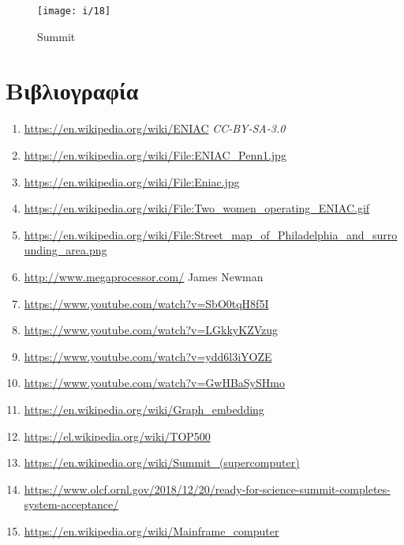 \documentclass[11pt,a4paper,notitlepage,fleqn]{article}
\begin{document}
\begin{figure}[H]
	\centering
	\texttt{[image: i/18]}\
	\caption{Summit}
	\label{fig:18}
\end{figure}


\newpage 

\section{Βιβλιογραφία}
\begin{enumerate}
	\item \url{https://en.wikipedia.org/wiki/ENIAC} \textit{CC-BY-SA-3.0}
	\item \url{https://en.wikipedia.org/wiki/File:ENIAC_Penn1.jpg}
	\item \url{https://en.wikipedia.org/wiki/File:Eniac.jpg}
	\item \url{https://en.wikipedia.org/wiki/File:Two_women_operating_ENIAC.gif}
	\item \url{https://en.wikipedia.org/wiki/File:Street_map_of_Philadelphia_and_surrounding_area.png}
	\item \url{http://www.megaprocessor.com/} James Newman
	\item \url{https://www.youtube.com/watch?v=SbO0tqH8f5I}
	\item \url{https://www.youtube.com/watch?v=LGkkyKZVzug}
	\item \url{https://www.youtube.com/watch?v=ydd6l3iYOZE}
	\item \url{https://www.youtube.com/watch?v=GwHBaSySHmo}
	\item \url{https://en.wikipedia.org/wiki/Graph_embedding}
	\item \url{https://el.wikipedia.org/wiki/TOP500}
	\item \url{https://en.wikipedia.org/wiki/Summit_(supercomputer)}
	\item \url{https://www.olcf.ornl.gov/2018/12/20/ready-for-science-summit-completes-system-acceptance/}
	\item \url{https://en.wikipedia.org/wiki/Mainframe_computer}
\end{enumerate}
\end{document}
